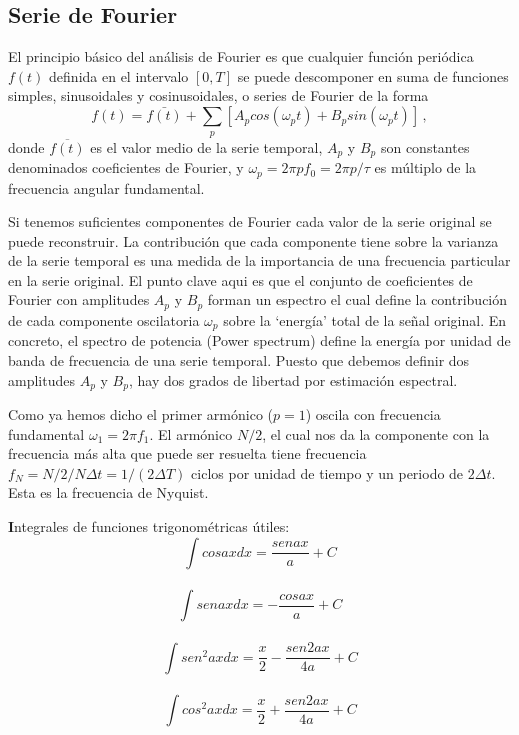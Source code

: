 \documentclass[
]{agujournal2019}
\begin{document}
\vspace{0.25cm}

\subsection{Serie de Fourier}\label{serie-de-fourier}

El principio básico del análisis de Fourier es que cualquier función
periódica \(f(t)\) definida en el intervalo \([0,T]\) se puede
descomponer en suma de funciones simples, sinusoidales y cosinusoidales,
o series de Fourier de la forma
\[f(t)=\bar{f(t)} + \sum\limits_p [A_p cos(\omega_p t) + B_p sin (\omega_p t)]\,,\]
donde \(\overline{f(t)}\) es el valor medio de la serie temporal,
\(A_p\) y \(B_p\) son constantes denominados coeficientes de Fourier, y
\(\omega_p=2 \pi p f_0=2\pi p/\tau\) es múltiplo de la frecuencia
angular fundamental.

Si tenemos suficientes componentes de Fourier cada valor de la serie
original se puede reconstruir. La contribución que cada componente tiene
sobre la varianza de la serie temporal es una medida de la importancia
de una frecuencia particular en la serie original. El punto clave aqui
es que el conjunto de coeficientes de Fourier con amplitudes \(A_p\) y
\(B_p\) forman un espectro el cual define la contribución de cada
componente oscilatoria \(\omega_p\) sobre la `energía' total de la señal
original. En concreto, el spectro de potencia (Power spectrum) define la
energía por unidad de banda de frecuencia de una serie temporal. Puesto
que debemos definir dos amplitudes \(A_p\) y \(B_p\), hay dos grados de
libertad por estimación espectral.

Como ya hemos dicho el primer armónico (\(p=1\)) oscila con frecuencia
fundamental \(\omega_1=2\pi f_1\). El armónico \(N/2\), el cual nos da
la componente con la frecuencia más alta que puede ser resuelta tiene
frecuencia \(f_N=N/2/N\Delta t=1/(2\Delta T)\) ciclos por unidad de
tiempo y un periodo de \(2\Delta t\). Esta es la frecuencia de Nyquist.

\begin{framed}
{\noindent \textbf Integrales de funciones trigonométricas útiles:}
\\
$$\int { cos} ax dx =\frac{{ sen} ax}{a} + C$$
\\
$$\int { sen} ax dx =-\frac{{ cos} ax}{a} + C$$
\\
$$\int { sen}^2 ax dx =\frac{x}{2}-\frac{{sen} 2ax}{4a} + C$$
\\
$$\int { cos}^2 ax dx =\frac{x}{2}+\frac{{sen} 2ax}{4a} + C$$

\end{framed}
\end{document}
